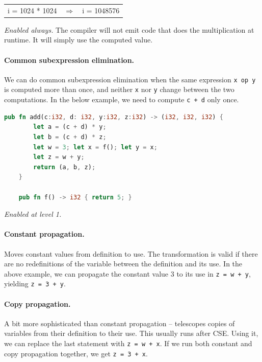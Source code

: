 \begin{center}
\vspace*{-1em}
\begin{tabular}{lll}
i = 1024 * 1024 &
$\Longrightarrow$ &
i = 1048576
\end{tabular}
\end{center}

\noindent \emph{Enabled always.} The compiler will not emit
code that does the multiplication at runtime. It will simply use the
computed value.

\paragraph{Common subexpression elimination.} We can do common subexpression elimination
when the same expression {\tt x op y} is computed more than once, and
neither {\tt x} nor {\tt y} change between the two computations. In the
below example, we need to compute {\tt c + d} only once.


\begin{lstlisting}[language=Rust]
    pub fn add(c:i32, d: i32, y:i32, z:i32) -> (i32, i32, i32) {
        let a = (c + d) * y;
        let b = (c + d) * z;
        let w = 3; let x = f(); let y = x;
        let z = w + y;
        return (a, b, z);
    }

    pub fn f() -> i32 { return 5; }
\end{lstlisting}

\noindent \emph{Enabled at level 1.}

\paragraph{Constant propagation.} Moves constant values from definition to
use. The transformation is valid if there are no redefinitions of the
variable between the definition and its use. In the above example,
we can propagate the constant value 3 to its use in {\tt z = w + y},
yielding {\tt z = 3 + y}.

\paragraph{Copy propagation.} A bit more sophisticated than constant
propagation -- telescopes copies of variables from their definition to
their use. This usually runs after CSE. Using it, we can replace the
last statement with {\tt z = w + x}. If we run both constant and copy
propagation together, we get {\tt z = 3 + x}.

